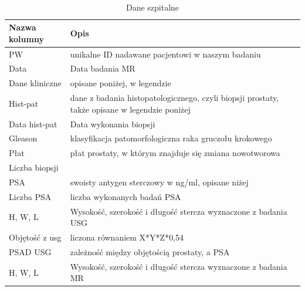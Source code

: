 \documentclass[a4paper,11pt,twoside]{report}
\theoremstyle{definition}
\begin{document}
\\
\begin{table}[h!]
\caption{Dane szpitalne}
\centering
\begin{tabular}{|l|p{10cm}|} \hline 
Nazwa kolumny & Opis \\ \hline 
PW & unikalne ID nadawane pacjentowi w naszym badaniu                                                             \\ \hline 
Data & Data badania MR                                                                                              \\ \hline 
Dane kliniczne & opisane poniżej, w legendzie                                                                       \\ \hline 
Hist-pat & dane z badania histopatologicznego, czyli biopsji prostaty, także opisane w legendzie poniżej            \\ \hline 
Data hist-pat & Data wykonania biopsji                                                                              \\ \hline 
Gleason & klasyfikacja patomorfologiczna raka gruczołu krokowego                                                    \\ \hline 
Płat & płat prostaty, w którym znajduje się zmiana nowotworowa                                                      \\ \hline 
Liczba biopsji                                                                                                       \\ \hline 
PSA & swoisty antygen sterczowy w ng/ml, opisane niżej                                                              \\ \hline 
Liczba PSA & liczba wykonanych badań PSA                                                                            \\ \hline 
H, W, L & Wysokość, szerokość i długość stercza wyznaczone z badania USG                                                                  \\ \hline 
Objętość z usg & liczona równaniem X*Y*Z*0,54                                                                     \\ \hline 
PSAD USG & zależność między objętością prostaty, a PSA                                                              \\ \hline 
H, W, L & Wysokość, szerokość i długość stercza wyznaczone z badania MR                                                                   \\ \hline 

\end{tabular}
\end{table}
\end{document}
